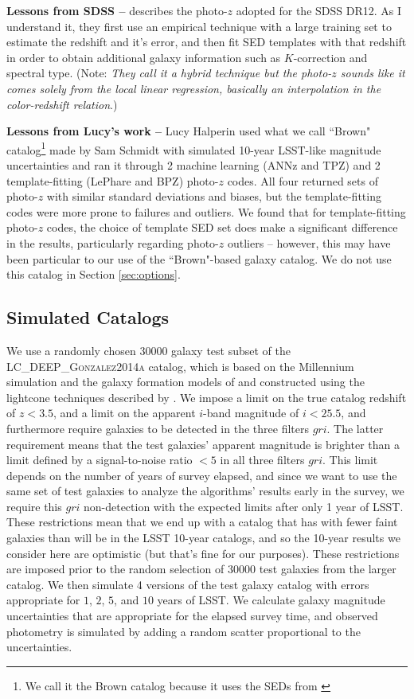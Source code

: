 \documentclass[DM,lsstdraft,toc]{lsstdoc}
\begin{document}
\textbf{Lessons from SDSS --} \cite{2016MNRAS.460.1371B} describes the photo-$z$ adopted for the SDSS DR12. As I understand it, they first use an empirical technique with a large training set to estimate the redshift and it's error, and then fit SED templates with that redshift in order to obtain additional galaxy information such as $K$-correction and spectral type. (Note: \textit{They call it a hybrid technique but the photo-$z$ sounds like it comes solely from the local linear regression, basically an interpolation in the color-redshift relation}.)

\textbf{Lessons from Lucy's work --} Lucy Halperin used what we call ``Brown" catalog\footnote{We call it the Brown catalog because it uses the SEDs from \cite{2014ApJS..212...18B}} made by Sam Schmidt with simulated 10-year LSST-like magnitude uncertainties and ran it through 2 machine learning (ANNz and TPZ) and 2 template-fitting (LePhare and BPZ) photo-$z$ codes. All four returned sets of photo-$z$ with similar standard deviations and biases, but the template-fitting codes were more prone to failures and outliers. We found that for template-fitting photo-$z$ codes, the choice of template SED set does make a significant difference in the results, particularly regarding photo-$z$ outliers -- however, this may have been particular to our use of the ``Brown"-based galaxy catalog. We do not use this catalog in Section \ref{sec:options}.

\subsection{Simulated Catalogs}\label{ssec:cats}

We use a randomly chosen 30000 galaxy test subset of the \textsc{LC\_DEEP\_Gonzalez2014a} catalog, which is based on the Millennium simulation \citep{2005Natur.435..629S} and the galaxy formation models of \cite{2014MNRAS.439..264G} and constructed using the lightcone techniques described by \cite{2013MNRAS.429..556M}. We impose a limit on the true catalog redshift of $z<3.5$, and a limit on the apparent $i$-band magnitude of $i<25.5$, and furthermore require galaxies to be detected in the three filters $gri$. The latter requirement means that the test galaxies' apparent magnitude is brighter than a limit defined by a signal-to-noise ratio $<5$ in all three filters $gri$. This limit depends on the number of years of survey elapsed, and since we want to use the same set of test galaxies to analyze the algorithms' results early in the survey, we require this $gri$ non-detection with the expected limits after only 1 year of LSST. These restrictions mean that we end up with a catalog that has with fewer faint galaxies than will be in the LSST 10-year catalogs, and so the 10-year results we consider here are optimistic (but that's fine for our purposes). These restrictions are imposed prior to the random selection of 30000 test galaxies from the larger catalog. We then simulate 4 versions of the test galaxy catalog with errors appropriate for $1$, $2$, $5$, and $10$ years of LSST. We calculate galaxy magnitude uncertainties that are appropriate for the elapsed survey time, and observed photometry is simulated by adding a random scatter proportional to the uncertainties.
\end{document}
